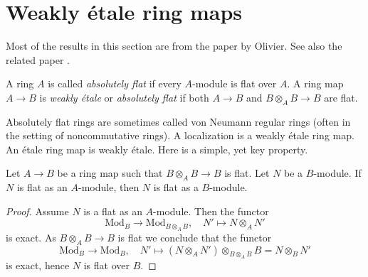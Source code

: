 %
%

\section{Weakly \'etale ring maps}
\label{section-weakly-etale}

\noindent
Most of the results in this section are from the paper
\cite{Olivier-AF} by Olivier. See also the related paper
\cite{Ferrand-epi}.

\begin{definition}
\label{definition-weakly-etale}
A ring $A$ is called {\it absolutely flat} if every $A$-module is flat over
$A$. A ring map $A \to B$ is {\it weakly \'etale} or {\it absolutely flat}
if both $A \to B$ and $B \otimes_A B \to B$ are flat.
\end{definition}

\noindent
Absolutely flat rings are sometimes called von Neumann regular rings
(often in the setting of noncommutative rings). A localization is a
weakly \'etale ring map. An \'etale ring map is weakly
\'etale. Here is a simple, yet key property.

\begin{lemma}
\label{lemma-key}
Let $A \to B$ be a ring map such that $B \otimes_A B \to B$ is flat.
Let $N$ be a $B$-module. If $N$ is flat as an $A$-module, then
$N$ is flat as a $B$-module.
\end{lemma}

\begin{proof}
Assume $N$ is a flat as an $A$-module.
Then the functor
$$
\text{Mod}_B \longrightarrow \text{Mod}_{B \otimes_A B},\quad
N' \mapsto N \otimes_A N'
$$
is exact. As $B \otimes_A B \to B$ is flat we conclude that the functor
$$
\text{Mod}_B \longrightarrow \text{Mod}_B,\quad
N' \mapsto (N \otimes_A N') \otimes_{B \otimes_A B} B = N \otimes_B N'
$$
is exact, hence $N$ is flat over $B$.
\end{proof}

